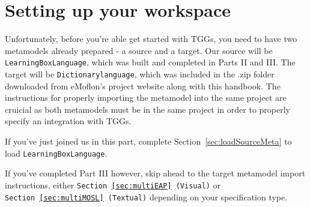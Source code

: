 \newpage
\section{Setting up your workspace}
\genHeader

Unfortunately, before you're able get started with  TGGs, you need to have two metamodels already prepared - a source and a target. Our source will be
\texttt{LearningBoxLanguage}, which was built and completed in Parts II and III. The target will be \texttt{Dictionarylanguage}, which was included in the .zip
folder downloaded from eMoflon's project website along with this handbook. The instructions for properly importing the metamodel into the same project are
cruicial as both metamodels must be in the same project in order to properly specify an integration with TGGs.

If you've just joined us in this part, complete Section~\ref{sec:loadSourceMeta} to load \texttt{Learn\-ing\-Box\-Lang\-uage}. 

If you've completed Part III however, skip ahead to the target metamodel import instructions, either \texttt{Section~\ref{sec:multiEAP} (Visual)} or
\texttt{Section~\ref{sec:multiMOSL} (Textual)} depending on your specification type.

